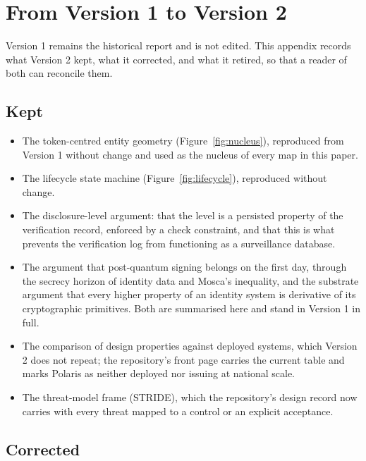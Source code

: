 \section{From Version 1 to Version 2}
\label{app:from-v1}

Version 1 remains the historical report and is not edited. This appendix records what Version 2
kept, what it corrected, and what it retired, so that a reader of both can reconcile them.

\subsection*{Kept}

\begin{itemize}
  \item The token-centred entity geometry (Figure~\ref{fig:nucleus}), reproduced from Version 1
    without change and used as the nucleus of every map in this paper.
  \item The lifecycle state machine (Figure~\ref{fig:lifecycle}), reproduced without change.
  \item The disclosure-level argument: that the level is a persisted property of the verification
    record, enforced by a check constraint, and that this is what prevents the verification log from
    functioning as a surveillance database.
  \item The argument that post-quantum signing belongs on the first day, through the secrecy
    horizon of identity data and Mosca's inequality, and the substrate argument that every higher
    property of an identity system is derivative of its cryptographic primitives. Both are summarised
    here and stand in Version 1 in full.
  \item The comparison of design properties against deployed systems, which Version 2 does not
    repeat; the repository's front page carries the current table and marks Polaris as neither
    deployed nor issuing at national scale.
  \item The threat-model frame (STRIDE), which the repository's design record now carries with every
    threat mapped to a control or an explicit acceptance.
\end{itemize}

\subsection*{Corrected}

